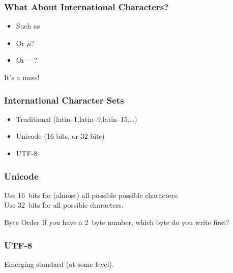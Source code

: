 \begin{frame}[fragile]
\frametitle{What About International Characters?}

\begin{itemize}
\item Such as %
\item Or $\mu$?
\item Or ---?
\end{itemize}
It's a mess!
\end{frame}

\begin{frame}[fragile]
\frametitle{International Character Sets}

\begin{itemize}
\item Traditional (latin--1,latin--9,latin--15,\ldots)
\item Unicode (16-bits, or 32-bits)
\item UTF-8
\end{itemize}
\end{frame}

\begin{frame}[fragile]
\frametitle{Unicode}

Use 16~bits for (almost) all possible possible characters.\\
Use 32~bits for all possible characters.

\begin{block}{Byte Order}
If you have a 2~byte number, which byte do you write first?
\end{block}

\end{frame}

\begin{frame}[fragile]
\frametitle{UTF-8}
Emerging standard (at some level).
\end{frame}


